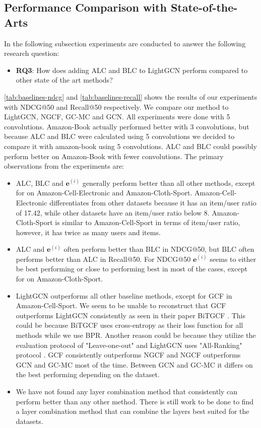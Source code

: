 \subsection{Performance Comparison with State-of-the-Arts}
In the following subsection experiments are conducted to answer the following research question:
\begin{itemize}
    \item \textbf{RQ3}: How does adding ALC and BLC to LightGCN perform compared to other state of the art methods?
\end{itemize}
\autoref{tab:baselines-ndcg} and \autoref{tab:baselines-recall} shows the results of our experiments with NDCG@50 and Recall@50 respectively.
We compare our method to LightGCN, NGCF, GC-MC and GCN.
All experiments were done with 5 convolutions. 
Amazon-Book actually performed better with 3 convolutions, but because ALC and BLC were calculated using 5 convolutions we decided to compare it with amazon-book using 5 convolutions.
ALC and BLC could possibly perform better on Amazon-Book with fewer convolutions.
The primary observations from the experiments are:
\begin{itemize}
    \item ALC, BLC and $\mathbf{e}^{(i)}$ generally perform better than all other methods, except for on Amazon-Cell-Electronic and Amazon-Cloth-Sport. Amazon-Cell-Electronic differentiates from other datasets because it has an item/user ratio of 17.42, while other datasets have an item/user ratio below 8. Amazon-Cloth-Sport is similar to Amazon-Cell-Sport in terms of item/user ratio, however, it has twice as many users and items.
    \item ALC and $\mathbf{e}^{(i)}$ often perform better than BLC in NDCG@50, but BLC often performs better than ALC in Recall@50. For NDCG@50 $\mathbf{e}^{(i)}$ seems to either be best performing or close to performing best in most of the cases, except for on Amazon-Cloth-Sport.
    \item LightGCN outperforms all other baseline methods, except for GCF in Amazon-Cell-Sport. We seem to be unable to reconstruct that GCF outperforms LightGCN consistently as seen in their paper BiTGCF \cite{BiTGCF}. This could be because BiTGCF uses cross-entropy as their loss function for all methods while we use BPR. Another reason could be because they utilize the evaluation protocol of "Leave-one-out" and LightGCN uses "All-Ranking" protocol \cite{BiTGCF,lightgcn}. GCF consistently outperforms NGCF and NGCF outperforms GCN and GC-MC most of the time. Between GCN and GC-MC it differs on the best performing depending on the dataset.
    \item We have not found any layer combination method that consistently can perform better than any other method. There is still work to be done to find a layer combination method that can combine the layers best suited for the datasets.
\end{itemize}
